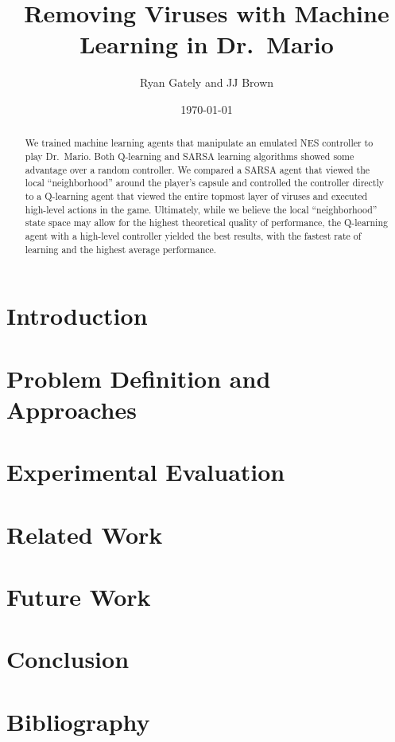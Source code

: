 \documentclass[letterpaper]{article} %
\author{Ryan Gately and JJ Brown}
\date{\today}
\title{Removing Viruses with Machine Learning in Dr.~Mario}
\begin{document}
\maketitle

\begin{abstract}
We trained machine learning agents that manipulate an emulated NES controller to play Dr.~Mario.
Both Q-learning and SARSA learning algorithms showed some advantage over a random controller.
We compared a SARSA agent that viewed the local ``neighborhood'' around the player's capsule and controlled the controller directly to a Q-learning agent that viewed the entire topmost layer of viruses and executed high-level actions in the game. Ultimately, while we believe the local ``neighborhood'' state space may allow for the highest theoretical quality of performance, the Q-learning agent with a high-level controller yielded the best results, with the fastest rate of learning and the highest average performance.
\end{abstract}

\section{Introduction}

\section{Problem Definition and Approaches}

\section{Experimental Evaluation}

\section{Related Work}

\section{Future Work}

\section{Conclusion}

\section{Bibliography}
\end{document}
